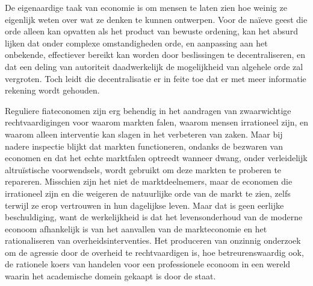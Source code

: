 \begin{blockquotebox}
De eigenaardige taak van economie is om mensen te laten zien hoe weinig ze eigenlijk weten over wat ze denken te kunnen ontwerpen. Voor de naïeve geest die orde alleen kan opvatten als het product van bewuste ordening, kan het absurd lijken dat onder complexe omstandigheden orde, en aanpassing aan het onbekende, effectiever bereikt kan worden door beslissingen te decentraliseren, en dat een deling van autoriteit daadwerkelijk de mogelijkheid van algehele orde zal vergroten. Toch leidt die decentralisatie er in feite toe dat er met meer informatie rekening wordt gehouden.\footnotemark
\end{blockquotebox}

Reguliere fiateconomen zijn erg behendig in het aandragen van zwaarwichtige rechtvaardigingen voor waarom markten falen, waarom mensen irrationeel zijn, en waarom alleen interventie kan slagen in het verbeteren van zaken. Maar bij nadere inspectie blijkt dat markten functioneren, ondanks de bezwaren van economen en dat het echte marktfalen optreedt wanneer dwang, onder verleidelijk altruïstische voorwendsels, wordt gebruikt om deze markten te proberen te repareren. Misschien zijn het niet de marktdeelnemers, maar de economen die irrationeel zijn en die weigeren de natuurlijke orde van de markt te zien, zelfs terwijl ze erop vertrouwen in hun dagelijkse leven. Maar dat is geen eerlijke beschuldiging, want de werkelijkheid is dat het levensonderhoud van de moderne econoom afhankelijk is van het aanvallen van de markteconomie en het rationaliseren van overheidsinterventies. Het produceren van onzinnig onderzoek om de agressie door de overheid te rechtvaardigen is, hoe betreurenswaardig ook, de rationele koers van handelen voor een professionele econoom in een wereld waarin het academische domein gekaapt is door de staat.
